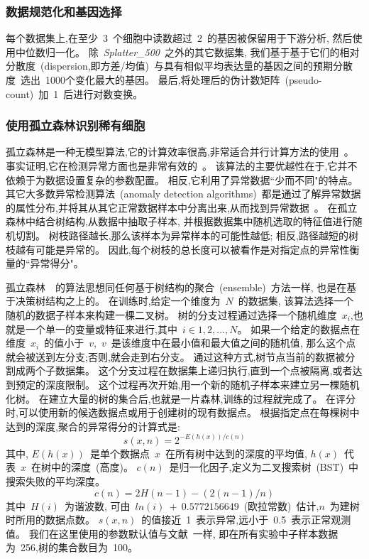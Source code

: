 \subsubsection{数据规范化和基因选择}
\label{subsec:datapreprocessing} 
每个数据集上,在至少~3~个细胞中读数超过~2~的基因被保留用于下游分析,
然后使用中位数归一化。
除~\textit{Splatter\_500}~之外的其它数据集,
我们基于基于它们的相对分散度~(dispersion,即方差/均值)~与具有相似平均表达量的基因之间的预期分散度~\cite{zheng2017massively,macosko2015highly}选出~1000个变化最大的基因。
最后,将处理后的伪计数矩阵~(pseudo-count)~加~1~后进行对数变换。

\subsubsection{使用孤立森林识别稀有细胞}
\label{subsec:if} 

孤立森林是一种无模型算法,它的计算效率很高,非常适合并行计算方法的使用~\cite{hariri2018batch}。
事实证明,它在检测异常方面也是非常有效的~\cite{susto2017anomaly}。
该算法的主要优越性在于,它并不依赖于为数据设置复杂的参数配置。
相反,它利用了异常数据``少而不同"的特点。
其它大多数异常检测算法~(anomaly detection algorithms)~都是通过了解异常数据的属性分布,并将其从其它正常数据样本中分离出来,从而找到异常数据~\cite{noto2010anomaly,chen2011ordinal,das2016incorporating}。
在孤立森林中结合树结构,从数据中抽取子样本,
并根据数据集中随机选取的特征值进行随机切割。
树枝路径越长,那么该样本为异常样本的可能性越低;
相反,路径越短的树枝越有可能是异常的。
因此,每个树枝的总长度可以被看作是对指定点的异常性衡量的``异常得分"。

孤立森林~\cite{liu2008isolation,liu2012isolation}~的算法思想同任何基于树结构的聚合~(ensemble)~方法一样,
也是在基于决策树结构之上的。
在训练时,给定一个维度为~$N$~的数据集,
该算法选择一个随机的数据子样本来构建一棵二叉树。
树的分支过程通过选择一个随机维度~$x_i$,也就是一个单一的变量或特征来进行,其中~$i \in {1,2,\ldots,N}$。
如果一个给定的数据点在维度~$x_i$~的值小于~$v$,~$v$~是该维度中在最小值和最大值之间的随机值,
那么这个点就会被送到左分支;否则,就会走到右分支。
通过这种方式,树节点当前的数据被分割成两个子数据集。
这个分支过程在数据集上递归执行,直到一个点被隔离,或者达到预定的深度限制。
这个过程再次开始,用一个新的随机子样本来建立另一棵随机化树。
在建立大量的树的集合后,也就是一片森林,训练的过程就完成了。
在评分时,可以使用新的候选数据点或用于创建树的现有数据点。
根据指定点在每棵树中达到的深度,聚合的异常得分的计算式是:
\begin{equation}
    \label{as}
    s(x,n) = 2^{-E(h(x))/c(n)}
\end{equation}
其中, $E(h(x))$~是单个数据点~$x$~在所有树中达到的深度的平均值, $h(x)$~代表~$x$~在树中的深度~(高度)。 
$c(n)$~是归一化因子,定义为二叉搜索树~(BST)~中搜索失败的平均深度。
\begin{equation}
    \label{lab:as}
    c(n) = 2H(n - 1) - (2(n - 1)/n)
\end{equation}
其中~$H(i)$~为谐波数,
可由~$ln(i)~+~0.5772156649$~(欧拉常数)~\cite{liu2012isolation}估计,$n$~为建树时所用的数据点数。
$s(x,n)$~的值接近~1~表示异常,远小于~0.5~表示正常观测值。
我们在这里使用的参数默认值与文献~\cite{liu2008isolation,liu2012isolation}一样,
即在所有实验中子样本数据为~256,树的集合数目为~100。

